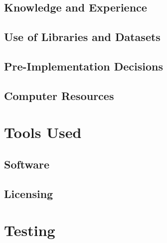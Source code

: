 \subsection{Knowledge and Experience}

\subsection{Use of Libraries and Datasets}

\subsection{Pre-Implementation Decisions}

\subsection{Computer Resources}


\section{Tools Used}

\subsection{Software}

\subsection{Licensing}


\section{Testing}


